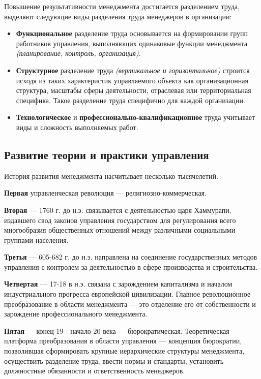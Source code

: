 \documentclass[a4paper,12pt,oneside,final]{extarticle}
\numberwithin{equation}{section}
\begin{document}
Повышение результативности менеджмента достигается разделением труда, выделяют следующие виды разделения труда менеджеров в организации:
\begin{itemize}
	\item \textbf{Функциональное} разделение труда основывается на формировании групп работников управления, выполняющих одинаковые функции менеджмента \textit{(планирование, контроль, организация)}.
	\item \textbf{Структурное} разделение труда \textit{(вертикальное и горизонтальное)} строится исходя из таких характеристик управляемого объекта как организационная структура, масштабы сферы деятельности, отраслевая или территориальная специфика. 
	Такое разделение труда специфично для каждой организации.
	\item \textbf{Технологическое} и \textbf{профессионально-квалификационное} труда учитывает виды и сложность выполняемых работ. 
\end{itemize}

\subsection{Развитие теории и практики управления}
История развития менеджмента насчитывает несколько тысячелетий.

\textbf{Первая} управленческая революция --- религиозно-коммерческая.

\textbf{Вторая} --- 1760 г. до н.э. связывается с деятельностью царя Хаммурапи, издавшего свод законов управления государством для регулирования всего многообразия общественных отношений между различными социальными группами населения.

\textbf{Третья} --- 605-682 г. до н.э. направлена на соединение государственных методов управления  с контролем за деятельностью в сфере производства и строительства.

\textbf{Четвертая} --- 17-18 в н.э. связана с зарождением капитализма и началом индустриального прогресса европейской цивилизации. 
Главное революционное преобразование в области менеджмента --- это отделение его от собственности и зарождение профессионального менеджмента.

\textbf{Пятая} --- конец 19 - начало 20 века --- бюрократическая. 
Теоретическая платформа преобразования в области управления --- концепция бюрократии, позволившая  сформировать крупные иерархические структуры менеджмента, осуществить разделение труда, ввести нормы и стандарты, установить должностные обязанности и ответственность менеджеров. 
\end{document}
